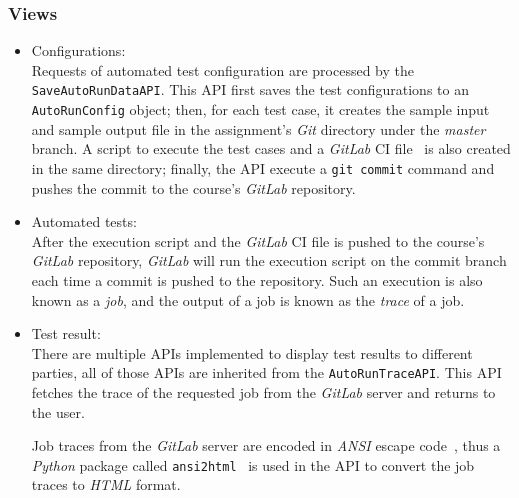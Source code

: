 \subsubsection{Views}
\begin{itemize}
    \item Configurations: \\
    Requests of automated test configuration are processed by the
    \texttt{Save\-Auto\-Run\-Data\-API}.
    This API first saves the test configurations to an \texttt{AutoRunConfig}
    object;
    then, for each test case, it creates the sample input and sample output
    file in the assignment's \emph{Git} directory under the \emph{master}
    branch.
    A script to execute the test cases and a \emph{GitLab} CI
    file~\cite{gitlabConfig} is also created in the same directory;
    finally, the API execute a \texttt{git commit} command and pushes the
    commit to the course's \emph{GitLab} repository.

    \item Automated tests: \\
    After the execution script and the \emph{GitLab} CI file is pushed to the
    course's \emph{GitLab} repository, \emph{GitLab} will run the execution
    script on the commit branch each time a commit is pushed to the repository.
    Such an execution is also known as a \emph{job}, and the output of a job
    is known as the \emph{trace} of a job.

    \item Test result: \\
    There are multiple APIs implemented to display test results to different
    parties, all of those APIs are inherited from the \texttt{AutoRunTraceAPI}.
    This API fetches the trace of the requested job from the \emph{GitLab}
    server and returns to the user.

    Job traces from the \emph{GitLab} server are encoded in \emph{ANSI} escape
    code~\cite{ansi}, thus a \emph{Python} package called
    \texttt{ansi2html}~\cite{ansi2html}
    is used in the API to convert the job traces to \emph{HTML} format.
\end{itemize}

